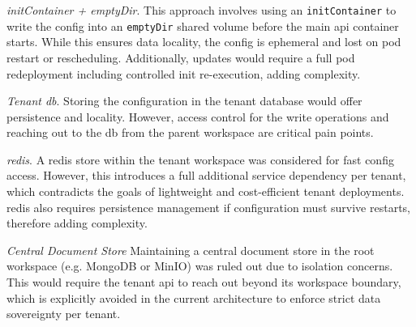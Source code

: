 \documentclass[11pt, a4paper, oneside, listof=totoc]{scrartcl}
\begin{document}
\begin{enumerate}[label={[\arabic*]:},
                    ref=Challenge~\arabic*,
                    leftmargin=*,
                    itemsep=0.6\baselineskip]
                    \item\label{chal:initContainer}
                        \textit{initContainer + emptyDir}.
                        This approach involves using an \texttt{initContainer} to write the config
                        into an \texttt{emptyDir} shared volume before the main \gls{api} container
                        starts.
                        While this ensures data locality, the config is ephemeral and lost on pod
                        restart or rescheduling.
                        Additionally, updates would require a full pod redeployment including
                        controlled init re-execution, adding complexity.

                    \item\label{chal:tenantDB}
                        \textit{Tenant \gls{db}}.
                        Storing the configuration in the tenant database would offer persistence and
                        locality.
                        However, access control for the write operations and reaching out to the
                        \gls{db} from the parent workspace are critical pain points.

                    \item\label{chal:redis}
                        \textit{\gls{redis}}.
                        A \gls{redis} store within the tenant workspace was considered for fast config
                        access.
                        However, this introduces a full additional service dependency per tenant,
                        which contradicts the goals of lightweight and cost-efficient tenant
                        deployments.
                        \gls{redis} also requires persistence management if configuration must survive
                        restarts, therefore adding complexity.

                    \item\label{cahl:centralStore}
                        \textit{Central Document Store}
                        Maintaining a central document store in the root workspace (e.g. MongoDB or
                        MinIO) was ruled out due to isolation concerns.
                        This would require the tenant \gls{api} to reach out beyond its workspace
                        boundary, which is explicitly avoided in the current architecture to enforce
                        strict data sovereignty per tenant.
                \end{enumerate}
\end{document}
